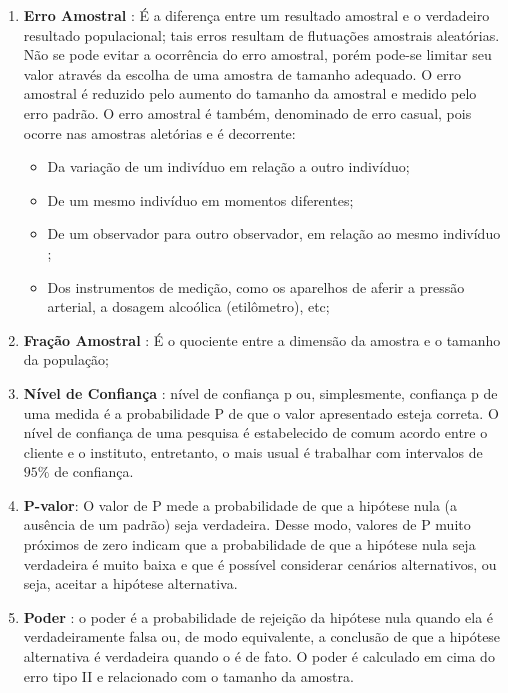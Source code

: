 \begin{enumerate}
\item \textbf{Erro Amostral} : É a diferença entre um resultado amostral e o verdadeiro resultado populacional; tais erros resultam de flutuações amostrais aleatórias. Não se pode evitar a ocorrência do erro amostral, porém pode-se limitar seu valor através da escolha de uma amostra de tamanho adequado. O erro amostral é reduzido pelo aumento do tamanho da amostral e medido pelo erro padrão. O erro amostral é também, denominado de erro casual, pois ocorre nas amostras aletórias e é decorrente:

\begin{itemize}
\item Da variação de um indivíduo em relação a outro indivíduo;
\item De um mesmo indivíduo em momentos diferentes;
\item De um observador para outro observador, em relação ao mesmo indivíduo ;
\item Dos instrumentos de medição, como os aparelhos de aferir a pressão arterial, a dosagem alcoólica (etilômetro), etc;
\end{itemize}


\item \textbf{Fração Amostral} : É o quociente entre a dimensão da
amostra e o tamanho da população; 
\item \textbf{Nível de
Confiança} : nível de confiança p ou, simplesmente, confiança p de
uma medida é a probabilidade P de que o valor apresentado esteja
correta. O nível de confiança de uma pesquisa é estabelecido de
comum acordo entre o cliente e o instituto, entretanto, o mais
usual é trabalhar com intervalos de $95\%$ de confiança.

\newpage
\item \textbf{P-valor}: O valor de P mede a probabilidade de que
a hipótese nula (a ausência de um padrão) seja verdadeira. Desse modo, valores de P muito
próximos de zero indicam que a probabilidade de que a hipótese nula seja verdadeira é muito
baixa e que é possível considerar cenários alternativos, ou seja, aceitar a hipótese alternativa.
\item \textbf{Poder} : o poder é a probabilidade de rejeição da hipótese nula quando ela é verdadeiramente falsa ou, de modo equivalente, a conclusão de que a hipótese alternativa é verdadeira quando o é de fato. O poder é calculado em cima do erro tipo II e relacionado com o tamanho da amostra.
\end{enumerate}




